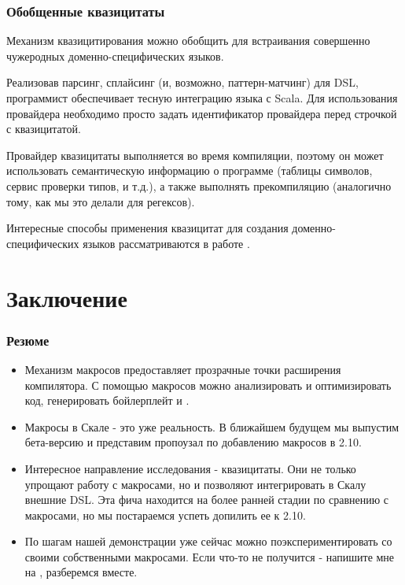 \documentclass[hyperref={bookmarks=false}]{beamer}
\begin{document}
\begin{frame}[t,fragile]
\frametitle{Обобщенные квазицитаты}
Механизм квазицитирования можно обобщить для встраивания совершенно чужеродных доменно-специфических языков.

Реализовав парсинг, сплайсинг (и, возможно, паттерн-матчинг) для DSL, программист обеспечивает тесную интеграцию языка с Scala. Для использования провайдера необходимо просто задать идентификатор провайдера перед строчкой с квазицитатой.

Провайдер квазицитаты выполняется во время компиляции, поэтому он может использовать семантическую информацию о программе (таблицы символов, сервис проверки типов, и т.д.), а также выполнять прекомпиляцию (аналогично тому, как мы это делали для регексов).

Интересные способы применения квазицитат для создания доменно-специфических языков рассматриваются в работе .

\end{frame}

\section{Заключение}

\begin{frame}[t,fragile]
\frametitle{Резюме}
\begin{itemize}
\item Механизм макросов предоставляет прозрачные точки расширения компилятора. С помощью макросов можно  анализировать и оптимизировать код, генерировать бойлерплейт и .
\item Макросы в Скале - это уже реальность. В ближайшем будущем мы выпустим бета-версию и представим пропоузал по добавлению макросов в 2.10.
\item Интересное направление исследования - квазицитаты. Они не только упрощают работу с макросами, но и позволяют интегрировать в Скалу внешние DSL. Эта фича находится на более ранней стадии по сравнению с макросами, но мы постараемся успеть допилить ее к 2.10.
\item По шагам нашей демонстрации уже сейчас можно поэкспериментировать со своими собственными макросами. Если что-то не получится - напишите мне на , разберемся вместе.
\end{itemize}
\end{frame}
\end{document}
